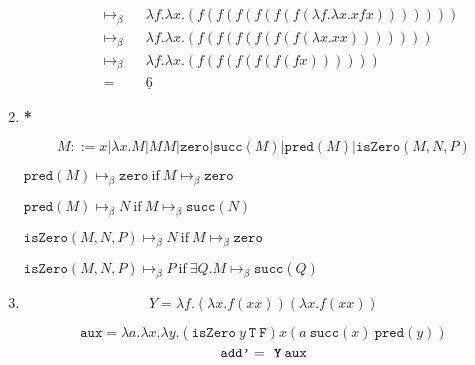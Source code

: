 \documentclass[11pt]{article}
\begin{document}
\begin{enumerate}
\begin{enumerate}
\begin{align*}
			             &  & \mapsto_\beta                                  &   & \lambda f. \lambda x. (f(f(f(f(f(f( \lambda f. \lambda x. x f x)))))))                                                           & \\
			             &  & \mapsto_\beta                                  &   & \lambda f. \lambda x. (f(f(f(f(f(f( \lambda x. x x )))))))                                                                       & \\
			             &  & \mapsto_\beta                                  &   & \lambda f. \lambda x. (f(f(f(f(f(f x))))))                                                                                       & \\
			             &  & =                                              &   & \underline{6}                                                                                                                    &
		            \end{align*}
	      \end{enumerate}
\newpage
	\item \textbf{*}

		$$
		M ::= x | \lambda x.M | M M | \texttt{zero} | \texttt{succ}(M) | \texttt{pred}( M ) | \texttt{isZero}( M,N,P )
		$$

		$ \texttt{pred}(M) \mapsto_\beta \texttt{zero} \: \text{if} \: M \mapsto_\beta \texttt{zero} $

		$ \texttt{pred}(M) \mapsto_\beta N \: \text{if} \: M \mapsto_\beta \texttt{succ}(N) $

		$ \texttt{isZero}(M,N,P) \mapsto_\beta N \: \text{if} \: M \mapsto_\beta \texttt{zero} $

		$ \texttt{isZero}(M,N,P) \mapsto_\beta P \: \text{if} \: \exists Q . M \mapsto_\beta \texttt{succ}(Q) $


	\item 

		$$ 
		Y = \lambda f.( \lambda x. f(xx))( \lambda x.f(xx))
		$$

		$$
		\texttt{aux} = \lambda a. \lambda x. \lambda y. ( \texttt{isZero} \: y \: \texttt{T} \: \texttt{F}) x ( a \: \texttt{succ}(x) \: \texttt{pred}(y))
		$$
		$$
		\texttt{add'} = \textbf{ \texttt{Y}} \: \texttt{aux} 
		$$


\end{enumerate}
\end{document}
